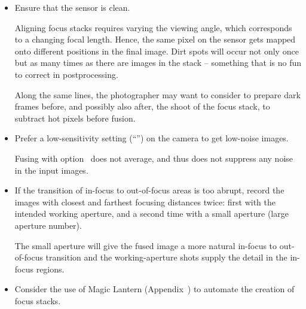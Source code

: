 \begin{itemize}
\item
  Ensure that the sensor is clean.

  Aligning focus stacks requires varying the viewing angle, which
  corresponds to a changing focal length.  Hence, the same pixel on
  the sensor gets mapped onto different positions in the final image.
  Dirt spots will occur not only once but as many times as there are
  images in the stack -- something that is no fun to correct in
  postprocessing.

  Along the same lines, the photographer may want to consider to
  prepare dark frames before, and possibly also after, the shoot of the focus
  stack, to subtract hot pixels
  before fusion.

\item
  Prefer a low-sensitivity setting (``'') on the camera
  to get low-noise images.

  Fusing with option~ does
  not average, and thus does not suppress any noise in the input
  images.

\item
  If the transition of in-focus to out-of-focus areas is too abrupt,
  record the images with closest and farthest focusing distances
  twice: first with the intended working aperture, and a second time
  with a small aperture (large aperture number).

  The small aperture will give the fused image a more natural in-focus
  to out-of-focus transition and the
  working-aperture shots supply the detail in the in-focus regions.

\item
  Consider the use of Magic Lantern
  (Appendix~) to automate the creation of
  focus stacks.
\end{itemize}

